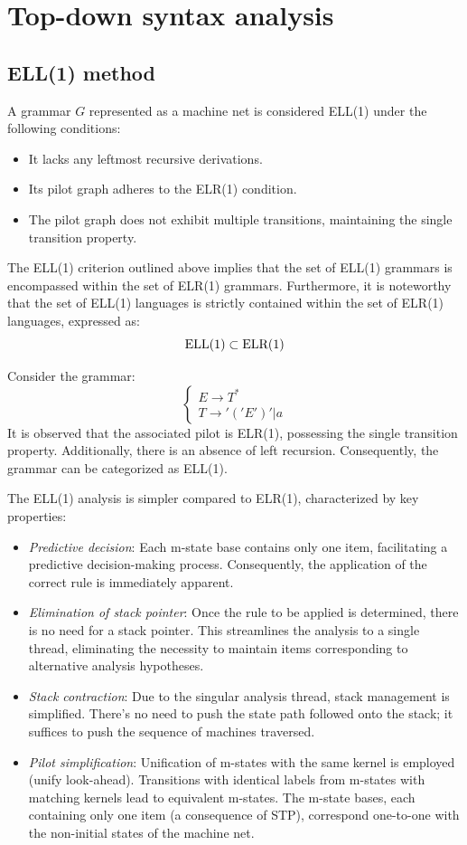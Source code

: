 \section{Top-down syntax analysis}

\subsection{ELL(1) method}
A grammar $G$ represented as a machine net is considered ELL(1) under the following conditions:
\begin{itemize}
    \item It lacks any leftmost recursive derivations.
    \item Its pilot graph adheres to the ELR(1) condition.
    \item The pilot graph does not exhibit multiple transitions, maintaining the single transition property.
\end{itemize}
The ELL(1) criterion outlined above implies that the set of ELL(1) grammars is encompassed within the set of ELR(1) grammars. 
Furthermore, it is noteworthy that the set of ELL(1) languages is strictly contained within the set of ELR(1) languages, expressed as:
\[\textnormal{ELL(1)} \subset \textnormal{ELR(1)}\]
\begin{example}
    Consider the grammar: 
    \[\begin{cases}
        E \rightarrow T^{*} \\
        T \rightarrow '('E')'|a
    \end{cases}\]
    It is observed that the associated pilot is ELR(1), possessing the single transition property.
    Additionally, there is an absence of left recursion. 
    Consequently, the grammar can be categorized as ELL(1).
\end{example}
The ELL(1) analysis is simpler compared to ELR(1), characterized by key properties:
\begin{itemize}
    \item \textit{Predictive decision}: Each m-state base contains only one item, facilitating a predictive decision-making process. 
        Consequently, the application of the correct rule is immediately apparent.
    \item \textit{Elimination of stack pointer}: Once the rule to be applied is determined, there is no need for a stack pointer. 
        This streamlines the analysis to a single thread, eliminating the necessity to maintain items corresponding to alternative analysis hypotheses.
    \item \textit{Stack contraction}: Due to the singular analysis thread, stack management is simplified. 
        There's no need to push the state path followed onto the stack; it suffices to push the sequence of machines traversed.
    \item \textit{Pilot simplification}: Unification of m-states with the same kernel is employed (unify look-ahead). 
        Transitions with identical labels from m-states with matching kernels lead to equivalent m-states. 
        The m-state bases, each containing only one item (a consequence of STP), correspond one-to-one with the non-initial states of the machine net.
\end{itemize}
